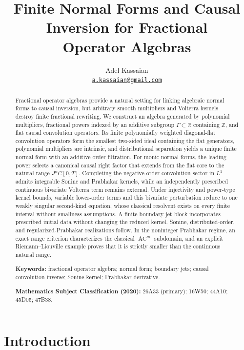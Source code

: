 \documentclass[11pt]{article}
\title{Finite Normal Forms and Causal Inversion for Fractional\\
Operator Algebras}
\author{Adel Kassaian\\
\small \href{mailto:a.kassaian@gmail.com}{\texttt{a.kassaian@gmail.com}}}
\date{}
\numberwithin{equation}{section}
\theoremstyle{definition}
\theoremstyle{remark}
\newcommand{\R}{\mathbb R}
\newcommand{\Z}{\mathbb Z}
\newcommand{\AC}{\operatorname{AC}}
\begin{document}
\maketitle

\begin{abstract}
Fractional operator algebras provide a natural setting for linking algebraic normal forms to causal inversion, but arbitrary smooth multipliers and Volterra kernels destroy finite fractional rewriting. We construct an algebra generated by polynomial multipliers, fractional powers indexed by an additive subgroup $\Gamma\subset\R$ containing $\Z$, and flat causal convolution operators. Its finite polynomially weighted diagonal-flat convolution operators form the smallest two-sided ideal containing the flat generators, polynomial multipliers are intrinsic, and distributional separation yields a unique finite normal form with an additive order filtration. For monic normal forms, the leading power selects a canonical causal right factor that extends from the flat core to the natural range $J^\alpha C[0,T]$. Completing the negative-order convolution sector in $L^1$ admits integrable Sonine and Prabhakar kernels, while an independently prescribed continuous bivariate Volterra term remains external. Under injectivity and power-type kernel bounds, variable lower-order terms and this bivariate perturbation reduce to one weakly singular second-kind equation, whose classical resolvent exists on every finite interval without smallness assumptions. A finite boundary-jet block incorporates prescribed initial data without changing the reduced kernel. Sonine, distributed-order, and regularized-Prabhakar realizations follow. In the noninteger Prabhakar regime, an exact range criterion characterizes the classical $\AC^m$ subdomain, and an explicit Riemann--Liouville example proves that it is strictly smaller than the continuous natural range.

\medskip
\noindent\textbf{Keywords:} fractional operator algebra; normal form; boundary jets; causal convolution inverse; Sonine kernel; Prabhakar derivative.

\medskip
\noindent\textbf{Mathematics Subject Classification (2020):} 26A33 (primary); 16W50; 44A10; 45D05; 47B38.
\end{abstract}

\section{Introduction}
\end{document}
